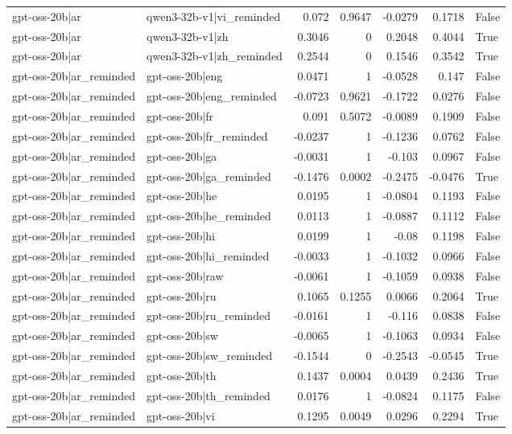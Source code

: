 \begin{table}
\begin{tabular}{l l r r r r l}
gpt-oss-20b|ar & qwen3-32b-v1|vi_reminded & 0.072 & 0.9647 & -0.0279 & 0.1718 & False \\
gpt-oss-20b|ar & qwen3-32b-v1|zh & 0.3046 & 0 & 0.2048 & 0.4044 & True \\
gpt-oss-20b|ar & qwen3-32b-v1|zh_reminded & 0.2544 & 0 & 0.1546 & 0.3542 & True \\
gpt-oss-20b|ar_reminded & gpt-oss-20b|eng & 0.0471 & 1 & -0.0528 & 0.147 & False \\
gpt-oss-20b|ar_reminded & gpt-oss-20b|eng_reminded & -0.0723 & 0.9621 & -0.1722 & 0.0276 & False \\
gpt-oss-20b|ar_reminded & gpt-oss-20b|fr & 0.091 & 0.5072 & -0.0089 & 0.1909 & False \\
gpt-oss-20b|ar_reminded & gpt-oss-20b|fr_reminded & -0.0237 & 1 & -0.1236 & 0.0762 & False \\
gpt-oss-20b|ar_reminded & gpt-oss-20b|ga & -0.0031 & 1 & -0.103 & 0.0967 & False \\
gpt-oss-20b|ar_reminded & gpt-oss-20b|ga_reminded & -0.1476 & 0.0002 & -0.2475 & -0.0476 & True \\
gpt-oss-20b|ar_reminded & gpt-oss-20b|he & 0.0195 & 1 & -0.0804 & 0.1193 & False \\
gpt-oss-20b|ar_reminded & gpt-oss-20b|he_reminded & 0.0113 & 1 & -0.0887 & 0.1112 & False \\
gpt-oss-20b|ar_reminded & gpt-oss-20b|hi & 0.0199 & 1 & -0.08 & 0.1198 & False \\
gpt-oss-20b|ar_reminded & gpt-oss-20b|hi_reminded & -0.0033 & 1 & -0.1032 & 0.0966 & False \\
gpt-oss-20b|ar_reminded & gpt-oss-20b|raw & -0.0061 & 1 & -0.1059 & 0.0938 & False \\
gpt-oss-20b|ar_reminded & gpt-oss-20b|ru & 0.1065 & 0.1255 & 0.0066 & 0.2064 & True \\
gpt-oss-20b|ar_reminded & gpt-oss-20b|ru_reminded & -0.0161 & 1 & -0.116 & 0.0838 & False \\
gpt-oss-20b|ar_reminded & gpt-oss-20b|sw & -0.0065 & 1 & -0.1063 & 0.0934 & False \\
gpt-oss-20b|ar_reminded & gpt-oss-20b|sw_reminded & -0.1544 & 0 & -0.2543 & -0.0545 & True \\
gpt-oss-20b|ar_reminded & gpt-oss-20b|th & 0.1437 & 0.0004 & 0.0439 & 0.2436 & True \\
gpt-oss-20b|ar_reminded & gpt-oss-20b|th_reminded & 0.0176 & 1 & -0.0824 & 0.1175 & False \\
gpt-oss-20b|ar_reminded & gpt-oss-20b|vi & 0.1295 & 0.0049 & 0.0296 & 0.2294 & True \\

\end{tabular}
\end{table}
